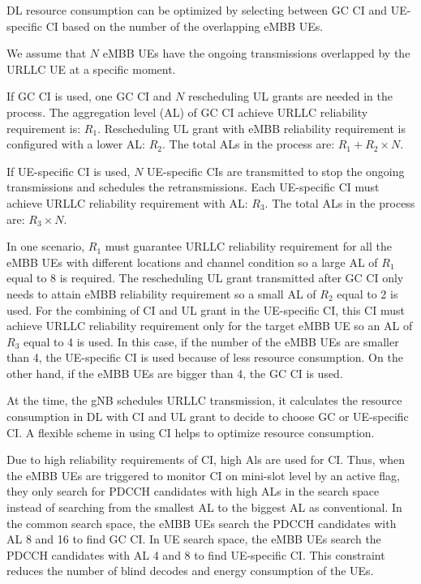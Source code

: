 \documentclass{ieeeaccess}
\begin{document}
DL resource consumption can be optimized by selecting between GC CI and UE-specific CI based on the number of the overlapping eMBB UEs.

We assume that $N$ eMBB UEs have the ongoing transmissions overlapped by the URLLC UE at a specific moment. 

If GC CI is used, one GC CI and $N$ rescheduling UL grants are needed in the process. The aggregation level (AL) of GC CI achieve URLLC reliability requirement is: $R_{1}$. Rescheduling UL grant with eMBB reliability requirement is configured with a lower AL: $R_{2}$. The total ALs in the process are: $R_{1} + R_{2}\times N$.

If UE-specific CI is used, $N$ UE-specific CIs are transmitted to stop the ongoing transmissions and schedules the retransmissions. Each UE-specific CI must achieve URLLC reliability requirement with AL: $R_{3}$. The total ALs in the process are: $R_{3}\times N$.

In one scenario, $R_{1}$ must guarantee URLLC reliability requirement for all the eMBB UEs with different locations and channel condition so a large AL of $R_{1}$ equal to 8 is required. The rescheduling UL grant transmitted after GC CI only needs to attain eMBB reliability requirement so a small AL of $R_{2}$ equal to 2 is used. For the combining of CI and UL grant in the UE-specific CI, this CI must achieve URLLC reliability requirement only for the target eMBB UE so an AL of $R_{3}$ equal to 4 is used. In this case, if the number of the eMBB UEs are smaller than 4, the UE-specific CI is used because of less resource consumption. On the other hand, if the eMBB UEs are bigger than 4, the GC CI is used.

At the time, the gNB schedules URLLC transmission, it calculates the resource consumption in DL with CI and UL grant to decide to choose GC or UE-specific CI. A flexible scheme in using CI helps to optimize resource consumption.

Due to high reliability requirements of CI, high Als are used for CI. Thus, when the eMBB UEs are triggered to monitor CI on mini-slot level by an active flag, they only search for PDCCH candidates with high ALs in the search space instead of searching from the smallest AL to the biggest AL as conventional. In the common search space, the eMBB UEs search the PDCCH candidates with AL 8 and 16 to find GC CI. In UE search space, the eMBB UEs search the PDCCH candidates with AL 4 and 8 to find UE-specific CI. This constraint reduces the number of blind decodes and energy consumption of the UEs.
\end{document}
